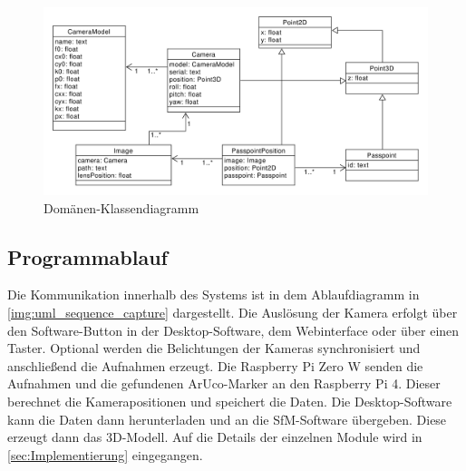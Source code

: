 \documentclass[./00PhotoBox.tex]{subfiles}
\begin{document}
\begin{figure}
  \centering
  \includegraphics[width=1\textwidth]{./img/uml/uml_domain.pdf}
  \caption{Domänen-Klassendiagramm} %
  \label{img:dokladia} %
\end{figure}

\subsection{Programmablauf}
Die Kommunikation innerhalb des Systems ist in dem Ablaufdiagramm in \autoref{img:uml_sequence_capture} dargestellt. Die Auslösung der Kamera erfolgt über den Software-Button in der Desktop-Software, dem Webinterface oder über einen Taster. Optional werden die Belichtungen der Kameras synchronisiert und anschließend die Aufnahmen erzeugt. Die Raspberry Pi Zero W senden die Aufnahmen und die gefundenen ArUco-Marker an den Raspberry Pi 4. Dieser berechnet die Kamerapositionen und speichert die Daten. Die Desktop-Software kann die Daten dann herunterladen und an die SfM-Software übergeben. Diese erzeugt dann das 3D-Modell. Auf die Details der einzelnen Module wird in \autoref{sec:Implementierung} eingegangen.
\end{document}
